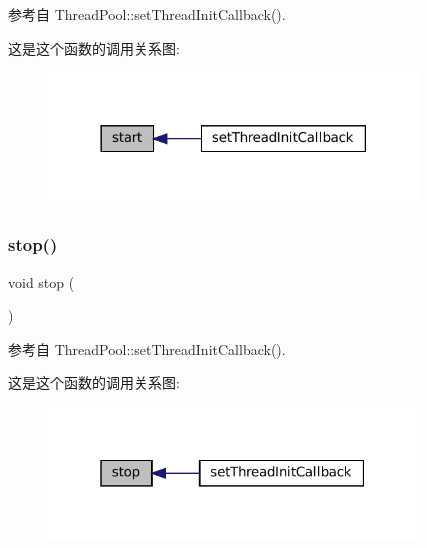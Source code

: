 参考自 Thread\+Pool\+::set\+Thread\+Init\+Callback().

这是这个函数的调用关系图\+:
\nopagebreak
\begin{figure}[H]
\begin{center}
\leavevmode
\includegraphics[width=278pt]{classmuduo_1_1ThreadPool_a8fd9dd10347539b445bb28ce204d0c2d_icgraph}
\end{center}
\end{figure}
\mbox{\label{classmuduo_1_1ThreadPool_a8c528baf37154d347366083f0f816846}} 
\subsubsection{\texorpdfstring{stop()}{stop()}}
{\footnotesize\ttfamily void stop (\begin{DoxyParamCaption}{ }\end{DoxyParamCaption})}



参考自 Thread\+Pool\+::set\+Thread\+Init\+Callback().

这是这个函数的调用关系图\+:
\nopagebreak
\begin{figure}[H]
\begin{center}
\leavevmode
\includegraphics[width=277pt]{classmuduo_1_1ThreadPool_a8c528baf37154d347366083f0f816846_icgraph}
\end{center}
\end{figure}
\mbox{\label{classmuduo_1_1ThreadPool_a3a83b91742d92c2ed7cc4c56b61912f0}} 
